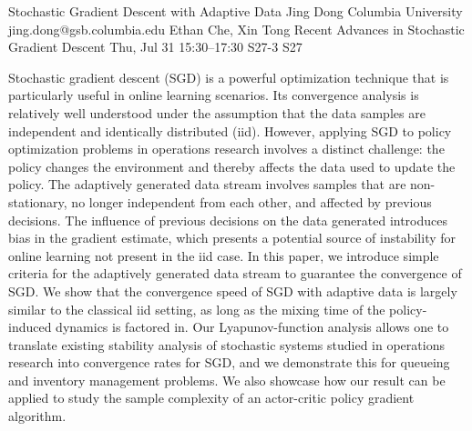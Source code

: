 \begin{talk}
  {Stochastic Gradient Descent with Adaptive Data}%
  {Jing Dong}%
  {Columbia University}%
  {jing.dong@gsb.columbia.edu}%
  {Ethan Che, Xin Tong}%
  {Recent Advances in Stochastic Gradient Descent}%
  {Thu, Jul 31 15:30–17:30}%
  {S27-3}%
  {S27}%
				
                
Stochastic gradient descent (SGD) is a powerful optimization technique that is particularly useful in online learning scenarios. Its convergence analysis is relatively well understood under the assumption that the data samples are independent and identically distributed (iid). However, applying SGD to policy optimization
problems in operations research involves a distinct challenge: the policy changes the environment and thereby affects the data used to update the policy. The adaptively generated data stream involves samples that are non-stationary, no longer independent from each other, and affected by previous decisions. The influence of previous decisions on the data generated introduces bias in the gradient estimate, which presents a potential source of instability for online learning not present in the iid case. In this paper, we introduce simple criteria for the adaptively generated data stream to guarantee the convergence of SGD. We show that the convergence
speed of SGD with adaptive data is largely similar to the classical iid setting, as long as the mixing time of the policy-induced dynamics is factored in. Our Lyapunov-function analysis allows one to translate existing stability analysis of stochastic systems studied in operations research into convergence rates for SGD, and
we demonstrate this for queueing and inventory management problems. We also showcase how our result can be applied to study the sample complexity of an actor-critic policy gradient algorithm.			


\medskip


\end{talk}

